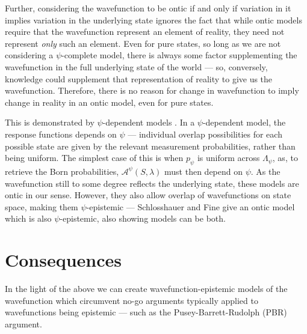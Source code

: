 \documentclass[superscriptaddress, floatfix,nofootinbib,12pt]{revtex4-2}
\begin{document}
Further, considering the wavefunction to be ontic if and only if variation in it implies variation in the underlying state ignores the fact that while ontic models require that the wavefunction represent an element of reality, they need not represent {\it only} such an element. Even for pure states, so long as we are not considering a $\psi$-complete model, there is always some factor supplementing the wavefunction in the full underlying state of the world --- so, conversely, knowledge could supplement that representation of reality to give us the wavefunction. Therefore, there is no reason for change in wavefunction to imply change in reality in an ontic model, even for pure states.

This is demonstrated by $\psi$-dependent models \cite{Schlosshauer2012Implications}. In a $\psi$-dependent model, the response functions depends on $\psi$ --- individual overlap possibilities for each possible state are given by the relevant measurement probabilities, rather than being uniform. The simplest case of this is when $p_\psi$ is uniform across $\Lambda_\psi$, as, to retrieve the Born probabilities, $\mathcal{A}^\psi(S,\lambda)$ must then depend on $\psi$. As the wavefunction still to some degree reflects the underlying state, these models are ontic in our sense. However, they also allow overlap of wavefunctions on state space, making them $\psi$-epistemic --- Schlosshauer and Fine give an ontic model which is also $\psi$-epistemic, also showing models can be both.

\section{Consequences}

In the light of the above we can create wavefunction-epistemic models of the wavefunction which circumvent no-go arguments typically applied to wavefunctions being epistemic --- such as the Pusey-Barrett-Rudolph (PBR) argument.
\end{document}
